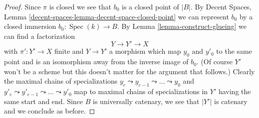 \documentclass[10pt,a4paper]{amsart}
\theoremstyle{plain}
\theoremstyle{definition}
\theoremstyle{remark}
\numberwithin{equation}{subsection}
\def\Spec{\mathop{\mathrm{Spec}}}
\begin{document}
\begin{proof}
\medskip\noindent
Since $\pi$ is closed we see that $b_0$ is a closed point of $|B|$.
By Decent Spaces, Lemma \ref{decent-spaces-lemma-decent-space-closed-point}
we can represent $b_0$ by a closed immersion $b_0 : \Spec(k) \to B$.
By Lemma \ref{lemma-construct-glueing}
we can find a factorization
$$
Y \to Y' \to X
$$
with $\pi' : Y' \to X$ finite and $Y \to Y'$ a morphism which
map $y_0$ and $y'_0$ to the same point and is an isomorphism
away from the inverse image of $b_0$.
(Of course $Y'$ won't be a scheme but this doesn't matter for the
argument that follows.)
Clearly the maximal chains of specializations
$y_c \leadsto y_{c - 1} \leadsto \ldots \leadsto y_0$ and
$y'_e \leadsto y'_{e - 1} \leadsto \ldots \leadsto y'_0$
map to maximal chains of specializations in $Y'$ having
the same start and end.
Since $B$ is universally catenary, we see that
$|Y'|$ is catenary and we conclude as before.
\end{proof}
\end{document}
